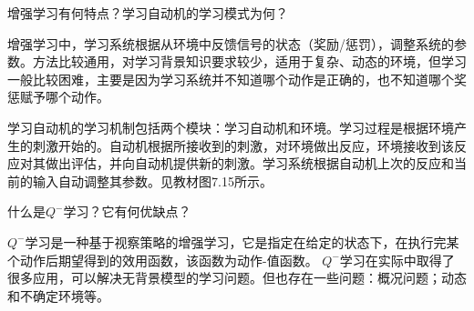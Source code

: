 \begin{question}
增强学习有何特点？学习自动机的学习模式为何？
\end{question}
\begin{solution}
增强学习中，学习系统根据从环境中反馈信号的状态（奖励/惩罚），调整系统的参数。方法比较通用，对学习背景知识要求较少，适用于复杂、动态的环境，但学习一般比较困难，主要是因为学习系统并不知道哪个动作是正确的，也不知道哪个奖惩赋予哪个动作。\par
学习自动机的学习机制包括两个模块：学习自动机和环境。学习过程是根据环境产生的刺激开始的。自动机根据所接收到的刺激，对环境做出反应，环境接收到该反应对其做出评估，并向自动机提供新的刺激。学习系统根据自动机上次的反应和当前的输入自动调整其参数。见教材图7.15所示。
\end{solution}

\begin{question}
什么是$Q^-$学习？它有何优缺点？
\end{question}
\begin{solution}
$Q^-$学习是一种基于视察策略的增强学习，它是指定在给定的状态下，在执行完某个动作后期望得到的效用函数，该函数为动作-值函数。
$Q^-$学习在实际中取得了很多应用，可以解决无背景模型的学习问题。但也存在一些问题：概况问题；动态和不确定环境等。
\end{solution}